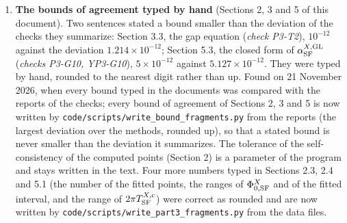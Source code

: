 \documentclass[
  10pt,
]{article}
\begin{document}
\begin{enumerate}
  the earlier work on the super-loop, and the names of the Standard
  Model, which the author had given to establish terms, symbols and
  conventions, were then read as physical identifications. Section 5.6
  now answers separately whether the superfluid is the Higgs field of
  its own group (yes, in every method, with an amplitude mode broader
  than its mass) and whether it can be the Higgs field of the Standard
  Model (no, by its quantum numbers); Table A3 and Figure A3 no longer
  contain values in GeV or values of the Standard Model; the massless
  gauge boson is the zeugon (remark R7); and the spinor field is called
  the DiracLike field.
\item
  \textbf{The bounds of agreement typed by hand} (Sections 2, 3 and 5 of
  this document). Two sentences stated a bound smaller than the
  deviation of the checks they summarize: Section 3.3, the gap equation
  (\emph{check P3-T2}), \(10^{-12}\) against the deviation
  \(1.214\times10^{-12}\); Section 5.3, the closed form of
  \(\alpha^{X,{\rm GL}}_{\rm SF}\) (\emph{checks P3-G10, YP3-G10}),
  \(5\times10^{-12}\) against \(5.127\times10^{-12}\). They were typed
  by hand, rounded to the nearest digit rather than up. Found on 21
  November 2026, when every bound typed in the documents was compared
  with the reports of the checks; every bound of agreement of Sections
  2, 3 and 5 is now written by
  \texttt{code/scripts/write\_bound\_fragments.py} from the reports (the
  largest deviation over the methods, rounded up), so that a stated
  bound is never smaller than the deviation it summarizes. The tolerance
  of the self-consistency of the computed points (Section 2) is a
  parameter of the program and stays written in the text. Four more
  numbers typed in Sections 2.3, 2.4 and 5.1 (the number of the fitted
  points, the ranges of \(\Phi^X_{0,{\rm SF}}\) and of the fitted
  interval, and the range of \(2\pi T^{X,{\rm c}}_{\rm SF}\)) were
  correct as rounded and are now written by
  \texttt{code/scripts/write\_part3\_fragments.py} from the data files.
\end{enumerate}
\end{document}
